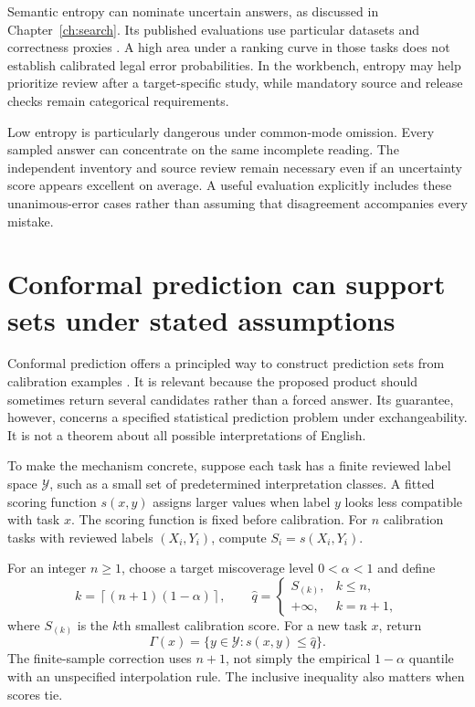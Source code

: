 Semantic entropy can nominate uncertain answers, as discussed in
Chapter~\ref{ch:search}. Its published evaluations use particular datasets and
correctness proxies \citep{semantic2023}. A high area under a ranking curve in
those tasks does not establish calibrated legal error probabilities. In the
workbench, entropy may help prioritize review after a target-specific study, while
mandatory source and release checks remain categorical requirements.

Low entropy is particularly dangerous under common-mode omission. Every sampled
answer can concentrate on the same incomplete reading. The independent inventory
and source review remain necessary even if an uncertainty score appears excellent
on average. A useful evaluation explicitly includes these unanimous-error cases
rather than assuming that disagreement accompanies every mistake.

\section{Conformal prediction can support sets under stated assumptions}
\label{merge:M09:09}


Conformal prediction offers a principled way to construct prediction sets from
calibration examples \citep[section 1.1 and appendix D]{conformal2022}. It is
relevant because the proposed product should sometimes return several candidates
rather than a forced answer. Its guarantee, however, concerns a specified
statistical prediction problem under exchangeability. It is not a theorem about
all possible interpretations of English.

To make the mechanism concrete, suppose each task has a finite reviewed label
space $\mathcal Y$, such as a small set of predetermined interpretation classes.
A fitted scoring function $s(x,y)$ assigns larger values when label $y$ looks less
compatible with task $x$. The scoring function is fixed before calibration.
For $n$ calibration tasks with reviewed labels $(X_i,Y_i)$, compute
$S_i=s(X_i,Y_i)$.

For an integer $n\geq1$, choose a target miscoverage level
$0<\alpha<1$ and define
\begin{equation}
 k=\left\lceil(n+1)(1-\alpha)\right\rceil,
 \qquad
 \widehat q=\begin{cases}
 S_{(k)},&k\leq n,\\
 +\infty,&k=n+1,
 \end{cases}
 \label{eq:conformal-quantile}
\end{equation}
where $S_{(k)}$ is the $k$th smallest calibration score. For a new task $x$, return
\begin{equation}
 \Gamma(x)=\{y\in\mathcal Y:s(x,y)\leq\widehat q\}.
 \label{eq:conformal-set}
\end{equation}
The finite-sample correction uses $n+1$, not simply the empirical $1-\alpha$
quantile with an unspecified interpolation rule. The inclusive inequality also
matters when scores tie.

